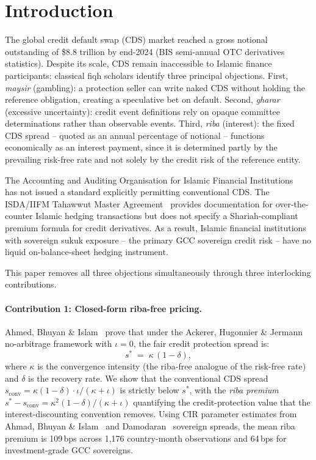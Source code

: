 \documentclass[12pt]{article}
\theoremstyle{plain}
\theoremstyle{definition}
\theoremstyle{remark}
\begin{document}
\newpage
\tableofcontents
\newpage

\section{Introduction}
\label{sec:intro}

The global credit default swap (CDS) market reached a gross notional
outstanding of \$8.8 trillion by end-2024 (BIS semi-annual OTC derivatives
statistics).
Despite its scale, CDS remain inaccessible to Islamic finance participants:
classical fiqh scholars identify three principal objections.
First, \emph{maysir} (gambling): a protection seller can write naked CDS
without holding the reference obligation, creating a speculative bet on
default.
Second, \emph{gharar} (excessive uncertainty): credit event definitions
rely on opaque committee determinations rather than observable events.
Third, \emph{riba} (interest): the fixed CDS spread -- quoted as an annual
percentage of notional -- functions economically as an interest payment, since
it is determined partly by the prevailing risk-free rate and not solely by
the credit risk of the reference entity.

The Accounting and Auditing Organisation for Islamic Financial
Institutions~\cite{AAOIFI2017} has not issued a standard explicitly
permitting conventional CDS.
The ISDA/IIFM Tahawwut Master Agreement~\cite{IIFM2010} provides
documentation for over-the-counter Islamic hedging transactions but does
not specify a Shariah-compliant premium formula for credit derivatives.
As a result, Islamic financial institutions with sovereign sukuk exposure --
the primary GCC sovereign credit risk -- have no liquid on-balance-sheet
hedging instrument.

This paper removes all three objections simultaneously through three
interlocking contributions.

\paragraph{Contribution 1: Closed-form riba-free pricing.}
Ahmed, Bhuyan \& Islam~\cite{ABIb2026} prove that under the Ackerer,
Hugonnier \& Jermann~\cite{AHJ2024} no-arbitrage framework with
$\iota = 0$, the fair credit protection spread is:
\begin{equation}
  s^* \;=\; \kappa\,(1 - \delta),
  \label{eq:icds_main}
\end{equation}
where $\kappa$ is the convergence intensity (the riba-free analogue of the
risk-free rate) and $\delta$ is the recovery rate.
We show that the conventional CDS spread $s_{\text{conv}} =
\kappa(1{-}\delta)\cdot\iota/(\kappa{+}\iota)$ is strictly below $s^*$,
with the \emph{riba premium} $s^* - s_{\text{conv}} =
\kappa^2(1-\delta)/(\kappa+\iota)$ quantifying the credit-protection value
that the interest-discounting convention removes.
Using CIR parameter estimates from Ahmad, Bhuyan \& Islam~\cite{ABIa2026}
and Damodaran~\cite{Damodaran2026} sovereign spreads, the mean riba premium
is 109\,bps across 1,176 country-month observations and 64\,bps for
investment-grade GCC sovereigns.
\end{document}
